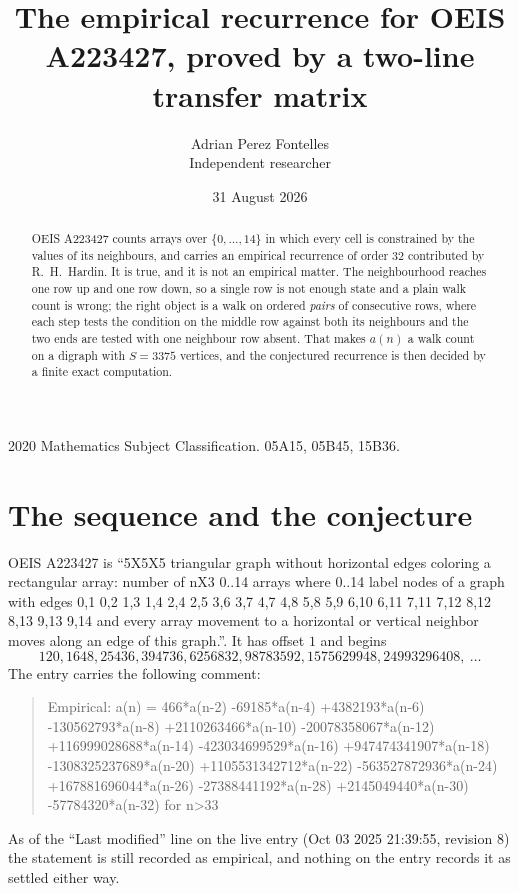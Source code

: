 \documentclass[11pt,a4paper]{article}
\title{The empirical recurrence for OEIS A223427, proved by a two-line transfer matrix}
\author{Adrian Perez Fontelles\\ \small Independent researcher}
\date{31 August 2026}
\theoremstyle{plain}
\theoremstyle{definition}
\begin{document}
\maketitle

\begin{abstract}
OEIS A223427 counts arrays over $\{0,\dots,14\}$ in which every cell is constrained by the
values of its neighbours, and carries an empirical recurrence of order $32$ contributed
by R.~H.~Hardin. It is true, and it is not an empirical matter. The neighbourhood reaches one
row up and one row down, so a single row is not enough state and a plain walk count
is wrong; the right object is a walk on ordered \emph{pairs} of consecutive rows, where
each step tests the condition on the middle row against both its neighbours and the two
ends are tested with one neighbour row absent. That makes $a(n)$ a walk count on a digraph
with $S=3375$ vertices, and the conjectured recurrence is then decided by a finite exact
computation.
\end{abstract}

\noindent\small 2020 Mathematics Subject Classification. 05A15, 05B45, 15B36.\normalsize

\section{The sequence and the conjecture}

OEIS A223427 is ``5X5X5 triangular graph without horizontal edges coloring a rectangular array: number of nX3 0..14 arrays where 0..14 label nodes of a graph with edges 0,1 0,2 1,3 1,4 2,4 2,5 3,6 3,7 4,7 4,8 5,8 5,9 6,10 6,11 7,11 7,12 8,12 8,13 9,13 9,14 and every array movement to a horizontal or vertical neighbor moves along an edge of this graph.''. It has offset $1$ and begins
\[
120, 1648, 25436, 394736, 6256832, 98783592, 1575629948, 24993296408,\ \dots
\]
The entry carries the following comment:
\begin{quote}\small
Empirical: a(n) = 466*a(n-2) -69185*a(n-4) +4382193*a(n-6) -130562793*a(n-8) +2110263466*a(n-10) -20078358067*a(n-12) +116999028688*a(n-14) -423034699529*a(n-16) +947474341907*a(n-18) -1308325237689*a(n-20) +1105531342712*a(n-22) -563527872936*a(n-24) +167881696044*a(n-26) -27388441192*a(n-28) +2145049440*a(n-30) -57784320*a(n-32) for n>33
\end{quote}
As of the ``Last modified'' line on the live entry (Oct 03 2025 21:39:55, revision 8) the statement is
still recorded as empirical, and nothing on the entry records it as settled either way.
\end{document}
